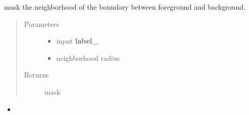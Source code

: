 \documentclass[letterpaper,10pt,english]{sphinxmanual}
\begin{document}

\begin{fulllineitems}
\label{\detokenize{index:unet.loss.mask_boundary_neighborhood}}
mask the neighborhood of the boundary between foreground and background.
\begin{quote}\begin{description}
\item[{Parameters}] \leavevmode\begin{itemize}
\item {} 
 \textendash{} input {\color{red}\bfseries{}label\_}

\item {} 
 \textendash{} neighborhood radius

\end{itemize}

\item[{Returns}] \leavevmode
mask

\end{description}\end{quote}



\begin{itemize}
\item {} 
{\hyperref[\detokenize{index:unet.loss.weighted_cross_entropy_with_boundary}]{}}

\end{itemize}



\end{fulllineitems}

\end{document}
